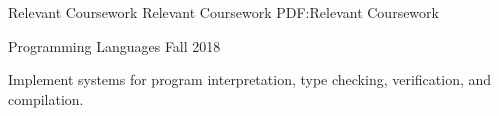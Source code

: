 \Section
{Relevant Coursework}
{Relevant Coursework}
{PDF:Relevant Coursework}

\Entry
\UMassTitle
\SubEntry
\Gap
Programming Languages
\dotfill
Fall 2018
\begin{Detail}
    \SubBulletItem
    Implement systems for program interpretation, type checking, verification, and compilation.
\end{Detail}
